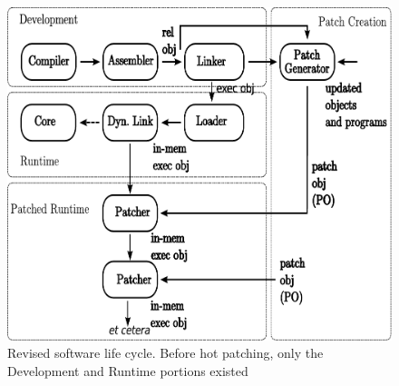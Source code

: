 \begin{figure}[ht]
\begin{center}
\includegraphics{software_lifecycle.pdf}
\end{center}
\caption{{\small Revised software life cycle. Before hot patching, only
    the Development and Runtime portions existed}}
\label{fig:lifecycle}
\end{figure}

